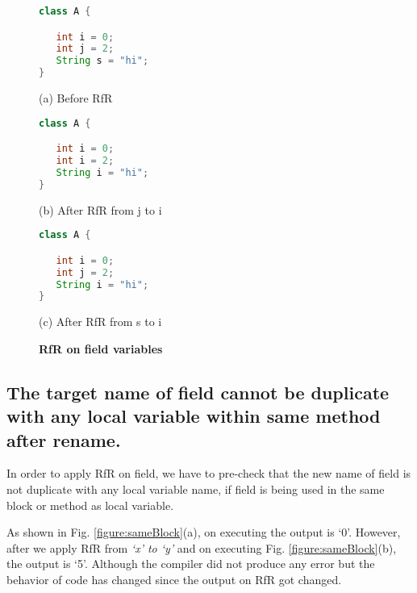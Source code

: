 \begin{figure}[th]
\centering	
\begin{minipage}[t]{0.45\linewidth}
\begin{lstlisting}[language=java, basicstyle=\scriptsize\ttfamily,frame=single]
class A {

   int i = 0;
   int j = 2;
   String s = "hi";
}

\end{lstlisting}
\centering(a) Before RfR
\end{minipage}
\hfill
\begin{minipage}[t]{0.45\linewidth}
\begin{lstlisting}[language=java, basicstyle=\scriptsize\ttfamily,frame=single]
class A {

   int i = 0;
   int i = 2;
   String i = "hi";
}
\end{lstlisting}
\centering(b) After RfR from j to i
\end{minipage}

\centering
\begin{minipage}[t]{0.45\linewidth}
\begin{lstlisting}[language=java, basicstyle=\scriptsize\ttfamily,frame=single]
class A {

   int i = 0;
   int j = 2;
   String i = "hi";
}
\end{lstlisting}
\centering(c) After RfR from s to i
\end{minipage}
\caption{\textbf{RfR on field variables}}
\label{figure:field}
\end{figure}


\subsection{The target name of field cannot be duplicate with any local variable within same method after rename.}
In order to apply RfR on field, we have to pre-check that the new name of field is not duplicate with any local variable name, if field is being used in the same block or method as local variable. 

As shown in Fig. \ref{figure:sameBlock}(a), on executing the output is `0'. However,  after we apply RfR from \emph{`x' to `y'} and on executing Fig. \ref{figure:sameBlock}(b), the output is `5'. Although the compiler did not produce any error but the behavior of code has changed since the output on RfR got changed. 

